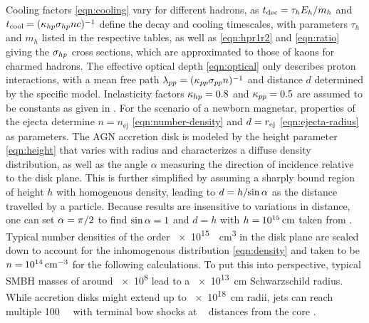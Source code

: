 Cooling factors \eqref{eqn:cooling} vary for different hadrons, as $t_\text{dec} \kern-0.5pt = \tau_h E_h / m_h$ and
$t_\text{cool} \kern-0.5pt = \cramped{(\kappa_{h \kern-0.1pt p} \sigma_{h \kern-0.1pt p} n c)^{-1}}$ define the decay and cooling timescales,
with parameters $\tau_h$ and $m_h$ listed in the respective tables, as well as \eqref{eqn:hpr1r2} and \eqref{eqn:ratio} giving the
$\sigma_{h \kern-0.1pt p}$ cross sections, which are approximated to those of kaons for charmed hadrons. The effective optical depth
\eqref{eqn:optical} only describes proton interactions, with a mean free path
$\lambda_{p \kern-0.1pt p} = \cramped{(\kappa_{p \kern-0.1pt p} \sigma_{p \kern-0.1pt p} n)^{-1}}$ and distance $d$ determined by the
specific model. Inelasticity factors $\kappa_{h \kern-0.1pt p} = \num{0.8}$ and $\kappa_{p \kern-0.1pt p} = \num{0.5}$ are assumed to
be constants as given in \cite{Carpio_2020}. For the scenario of a newborn magnetar, properties of the ejecta determine
$n = n_\text{ej}$ \eqref{eqn:number-density} and $d \kern+0.1pt = r_\text{ej}$ \eqref{eqn:ejecta-radius} as parameters. The AGN
accretion disk is modeled by the height parameter \eqref{eqn:height} that varies with radius and characterizes a diffuse density
distribution, as well as the angle $\alpha$ measuring the direction of incidence relative to the disk plane. This is further
simplified by assuming a sharply bound region of height $h$ with homogenous density, leading to $d = h / \kern-2.0pt \sin \alpha$
as the distance travelled by a particle. Because results are insensitive to variations in distance, one can set
$\alpha = \pi \kern+0.25pt / 2$ to find $\sin\alpha = \kern-0.1pt 1$ and $d = h$ with $h = \kern-0.5pt \smash{\qty{e15}{\centi\meter}}$
taken from \cite{King_2008}. Typical number densities of the order \qty{e15}{\per\centi\meter\cubed} in the disk plane
\cite{Garcia_2013, Garcia_2014} are scaled down to account for the inhomogenous distribution \eqref{eqn:density} and taken to be
$n = \kern-0.5pt \smash{\qty{e14}{\per\centi\meter\cubed}}$ for the following calculations. To put this into perspective, typical
SMBH masses of around \qty{e8}{\solarmass} lead to a \qty{e13}{\centi\meter} Schwarzschild radius. While accretion disks
might extend up to \qty{e18}{\centi\meter} radii, jets can reach multiple \qty{100}{\kilo\parsec} with terminal bow shocks at
\unit{\mega\parsec} distances from the core \cite{Blandford_2019, King_2008, Murase_2023}.

\newpage

